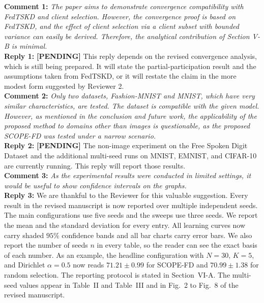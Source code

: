 \documentclass[10pt]{article}
\newcommand{\PENDING}[1]{{\color{red}\textbf{[PENDING] }#1}}
\begin{document}

\noindent
\textbf{Comment 1:} \textit{The paper aims to demonstrate convergence compatibility with FedTSKD and client selection. However, the convergence proof is based on FedTSKD, and the effect of client selection via a client subset with bounded variance can easily be derived. Therefore, the analytical contribution of Section V-B is minimal.} \\
\noindent
\textbf{Reply 1:} \PENDING{This reply depends on the revised convergence analysis, which is still being prepared. It will state the partial-participation result and the assumptions taken from FedTSKD, or it will restate the claim in the more modest form suggested by Reviewer 2.}\\

\noindent
\textbf{Comment 2:} \textit{Only two datasets, Fashion-MNIST and MNIST, which have very similar characteristics, are tested. The dataset is compatible with the given model. However, as mentioned in the conclusion and future work, the applicability of the proposed method to domains other than images is questionable, as the proposed SCOPE-FD was tested under a narrow scenario.} \\
\noindent
\textbf{Reply 2:} \PENDING{The non-image experiment on the Free Spoken Digit Dataset and the additional multi-seed runs on MNIST, EMNIST, and CIFAR-10 are currently running. This reply will report those results.}\\

\noindent
\textbf{Comment 3:} \textit{As the experimental results were conducted in limited settings, it would be useful to show confidence intervals on the graphs.} \\
\noindent
\textbf{Reply 3:} {We are thankful to the Reviewer for this valuable suggestion. Every result in the revised manuscript is now reported over multiple independent seeds. The main configurations use five seeds and the sweeps use three seeds. We report the mean and the standard deviation for every entry. All learning curves now carry shaded $95\%$ confidence bands and all bar charts carry error bars. We also report the number of seeds $n$ in every table, so the reader can see the exact basis of each number. As an example, the headline configuration with $N=30$, $K=5$, and Dirichlet $\alpha=0.5$ now reads $71.21 \pm 0.99$ for SCOPE-FD and $70.99 \pm 1.38$ for random selection. The reporting protocol is stated in Section~VI-A. The multi-seed values appear in Table~II and Table~III and in Fig.~2 to Fig.~8 of the revised manuscript.}\\
\end{document}
